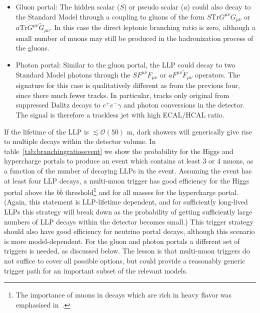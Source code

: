 \begin{itemize}
\item Gluon portal: The hidden scalar ($S$) or pseudo scalar ($a$) could also decay to the Standard Model through a coupling to gluons of the form $S \mathrm{Tr}G^{\mu\nu}G_{\mu\nu}$ or $a \mathrm{Tr}G^{\mu\nu}\tilde G_{\mu\nu}$. In this case the direct leptonic branching ratio is zero, although a small number of muons may still be produced in the hadronization process of the gluons.

\item Photon portal: Similar to the gluon portal, the LLP could decay to two Standard Model photons through the $S F^{\mu\nu}F_{\mu\nu}$ or $a F^{\mu\nu}\tilde F_{\mu\nu}$ operators. The signature for this case is qualitatively different as from the previous four, since there much fewer tracks. In particular, tracks only original from suppressed Dalitz decays to $e^+e^-\gamma$ and photon conversions in the detector. The signal is therefore a trackless jet with high ECAL/HCAL ratio.
\end{itemize}

If the lifetime of the LLP is $\lesssim \mathcal{O}(50)$ m, dark showers will generically give rise to multiple decays within the detector volume.  In table~\ref{tab:branchingratiosevent} we show the probability for the Higgs and hypercharge portals to produce an event which contains at least 3 or 4 muons, as a function of the number of decaying LLPs in the event. Assuming the event has at least four LLP decays, a multi-muon trigger has good efficiency for the Higgs portal above the $b\bar b$ threshold\footnote{The importance of muons in decays which are rich in heavy flavor was emphasised in~\cite{Strassler:2008fv}.} and for all masses for the hypercharge portal. (Again, this statement is LLP-lifetime dependent, and for sufficiently long-lived LLPs this strategy will break down as the probability of getting sufficiently large numbers of LLP decays within the detector becomes small.) This trigger strategy should also have good efficiency for  neutrino portal decays, although this scenario is more model-dependent. For the gluon and photon portals a different set of triggers is needed, as discussed below. The lesson is that multi-muon triggers do not suffice to cover all possible options, but could provide a reasonably generic trigger path for an important subset of the relevant models.

